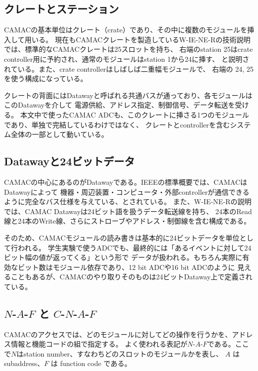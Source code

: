 \documentclass[uplatex,dvipdfmx,12pt,nomag]{jsarticle}
\begin{document}
\subsection{クレートとステーション}

CAMACの基本単位はクレート（crate）であり、その中に複数のモジュールを挿入して用いる。
現在もCAMACクレートを製造しているW-IE-NE-Rの技術説明では、標準的なCAMACクレートは25スロットを持ち、
右端のstation 25はcrate controller用に予約され、通常のモジュールはstation 1から24に挿す、
と説明されている\cite{camac-intro}。また、crate controllerはしばしば二重幅モジュールで、
右端の 24, 25 を使う構成になっている\cite{camac-intro}。

クレートの背面にはDatawayと呼ばれる共通バスが通っており、各モジュールはこのDatawayを介して
電源供給、アドレス指定、制御信号、データ転送を受ける\cite{ieee583,camac-intro}。
本文中で使ったCAMAC ADCも、このクレートに挿さる1つのモジュールであり、単独で完結しているわけではなく、
クレートとcontrollerを含むシステム全体の一部として動いている。

\subsection{Datawayと24ビットデータ}

CAMACの中心にあるのがDatawayである。IEEEの標準概要では、CAMACはDatawayによって
機器・周辺装置・コンピュータ・外部controllerが通信できるように完全なバス仕様を与えている、とされている\cite{ieee583}。
また、W-IE-NE-Rの説明では、CAMAC Datawayは24ビット語を扱うデータ転送線を持ち、
24本のRead線と24本のWrite線、さらにストローブやアドレス・制御線を含む構成である\cite{camac-intro}。

そのため、CAMACモジュールの読み書きは基本的に24ビットデータを単位として行われる。
学生実験で使うADCでも、最終的には「あるイベントに対して24ビット幅の値が返ってくる」という形で
データが扱われる。もちろん実際に有効なビット数はモジュール依存であり、12 bit ADCや16 bit ADCのように
見えることもあるが、CAMACのやり取りそのものは24ビットDataway上で定義されている。

\subsection{\texorpdfstring{$N$-$A$-$F$}{NAF} と \texorpdfstring{$C$-$N$-$A$-$F$}{CNAF}}

CAMACのアクセスでは、どのモジュールに対してどの操作を行うかを、アドレス情報と機能コードの組で指定する。
よく使われる表記が$N$-$A$-$F$である。ここで$N$はstation number、すなわちどのスロットのモジュールかを表し、
$A$ は subaddress、$F$ は function code である\cite{camac-intro}。
\end{document}
